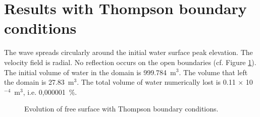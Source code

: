 \section{Results with Thompson boundary conditions}

The wave spreads circularly around the initial water surface peak elevation.
The velocity field is radial.
No reflection occurs on the open boundaries (cf. Figure
\ref{t2d:gouttedo:thompson_evol}).
The initial volume of water in the domain is 999.784~m$^3$.
The volume that left the domain is 27.83~m$^3$.
The total volume of water numerically lost is 0.11 $\times$ 10$^{-4}$~m$^3$,
i.e. 0,000001~\%.

\begin{figure}[H]
\begin{minipage}[t]{0.50\textwidth}
 \centering
\end{minipage}
\begin{minipage}[t]{0.50\textwidth}
 \centering
\end{minipage}
\begin{minipage}[t]{0.50\textwidth}
 \centering
\end{minipage}
\begin{minipage}[t]{0.50\textwidth}
 \centering
\end{minipage}
\begin{minipage}[t]{0.50\textwidth}
 \centering
\end{minipage}
\begin{minipage}[t]{0.50\textwidth}
 \centering
\end{minipage}
\begin{minipage}[t]{0.50\textwidth}
 \centering
\end{minipage}
\begin{minipage}[t]{0.50\textwidth}
 \centering
\end{minipage}
\caption{Evolution of free surface with Thompson boundary conditions.}
\label{t2d:gouttedo:thompson_evol}
\end{figure}



